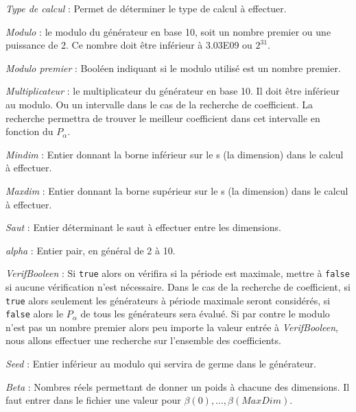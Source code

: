 
\noindent
{\it Type de calcul} : Permet de d\'eterminer le type de calcul
\`a effectuer.

\noindent
{\it Modulo} : le modulo du g\'en\'erateur en base 10, soit un nombre premier ou
une puissance de 2.  Ce nombre doit \^etre inf\'erieur \`a 3.03E09 ou $2^{31}$.

\noindent
{\it Modulo premier} : Bool\'een indiquant si le modulo utilis\'e est un 
nombre premier.

\noindent
{\it Multiplicateur} : le multiplicateur du g\'en\'erateur en base 10. Il doit \^etre
inf\'erieur au modulo.  Ou un intervalle dans le cas de la recherche de coefficient.
La recherche permettra de trouver le meilleur coefficient dans cet intervalle en fonction du
$P_\alpha$.

\noindent
{\it Mindim} : Entier  donnant la borne inf\'erieur sur le s (la dimension) 
dans le calcul \`a effectuer.  

\noindent
{\it Maxdim} : Entier  donnant la borne sup\'erieur sur le s (la dimension)
dans le calcul \`a effectuer.

\noindent
{\it Saut} : Entier d\'eterminant le saut \`a effectuer entre les dimensions.

\noindent
{\it alpha} : Entier pair, en g\'en\'eral de 2 \`a 10.

\noindent
{\it VerifBooleen} : Si {\tt true} alors on v\'erifira si la p\'eriode est maximale,
mettre \`a {\tt false} si aucune v\'erification n'est n\'ecessaire.  Dans le cas de 
la recherche de coefficient, si {\tt true} alors seulement les g\'en\'erateurs
\`a p\'eriode maximale seront consid\'er\'es, si {\tt false} alors le
$P_\alpha$ de tous les g\'en\'erateurs sera \'evalu\'e.  Si par contre le
modulo n'est pas un nombre premier alors peu importe la valeur entr\'ee \`a
{\it VerifBooleen},
nous allons effectuer une recherche sur l'ensemble des coefficients.


\noindent
{\it Seed} : Entier inf\'erieur au modulo qui servira de germe dans le g\'en\'erateur.  

\noindent
{\it Beta} : Nombres r\'eels permettant de donner un poids \`a chacune des dimensions.
Il faut entrer dans le fichier une valeur pour $\beta (0),...,\beta (MaxDim)$. 
